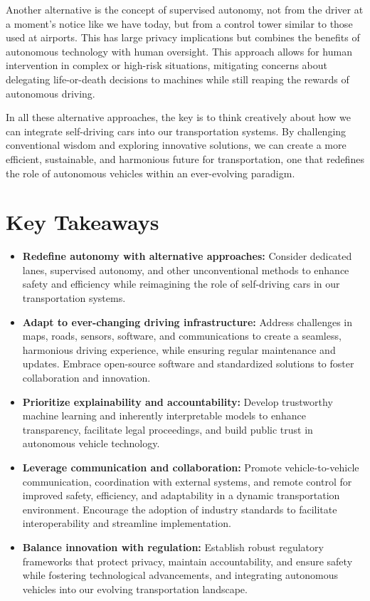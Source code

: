 Another alternative is the concept of supervised autonomy, not from the driver at a moment's notice like we have today, but from a control tower similar to those used at airports. This has large privacy implications but combines the benefits of autonomous technology with human oversight. This approach allows for human intervention in complex or high-risk situations, mitigating concerns about delegating life-or-death decisions to machines while still reaping the rewards of autonomous driving.

In all these alternative approaches, the key is to think creatively about how we can integrate self-driving cars into our transportation systems. By challenging conventional wisdom and exploring innovative solutions, we can create a more efficient, sustainable, and harmonious future for transportation, one that redefines the role of autonomous vehicles within an ever-evolving paradigm.

\section{Key Takeaways}

\begin{itemize}
\item \textbf{Redefine autonomy with alternative approaches:} Consider dedicated lanes, supervised autonomy, and other unconventional methods to enhance safety and efficiency while reimagining the role of self-driving cars in our transportation systems.
\item \textbf{Adapt to ever-changing driving infrastructure:} Address challenges in maps, roads, sensors, software, and communications to create a seamless, harmonious driving experience, while ensuring regular maintenance and updates. Embrace open-source software and standardized solutions to foster collaboration and innovation.
\item \textbf{Prioritize explainability and accountability:} Develop trustworthy machine learning and inherently interpretable models to enhance transparency, facilitate legal proceedings, and build public trust in autonomous vehicle technology.
\item \textbf{Leverage communication and collaboration:} Promote vehicle-to-vehicle communication, coordination with external systems, and remote control for improved safety, efficiency, and adaptability in a dynamic transportation environment. Encourage the adoption of industry standards to facilitate interoperability and streamline implementation.
\item \textbf{Balance innovation with regulation:} Establish robust regulatory frameworks that protect privacy, maintain accountability, and ensure safety while fostering technological advancements, and integrating autonomous vehicles into our evolving transportation landscape.
\end{itemize}
